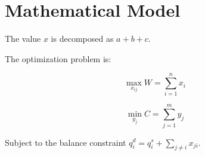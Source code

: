 \documentclass{article}
\begin{document}
\section{Mathematical Model}

The value $x$ is decomposed as $a + b + c$.

The optimization problem is:

\begin{equation}
\max_{x_{ij}} W = \sum_{i=1}^{n} x_i
\label{eq:welfare}
\end{equation}

\[
\min_{y_j} C = \sum_{j=1}^{m} y_j
\]

Subject to the balance constraint $q_i^d = q_i^s + \sum_{j \neq i} x_{ji}$.
\end{document}
